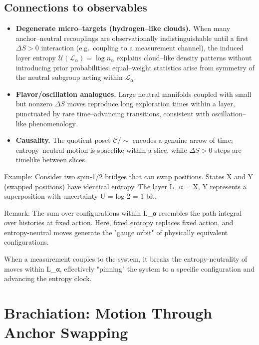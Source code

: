 \documentclass[11pt]{article}
\theoremstyle{plain}
\theoremstyle{definition}
\begin{document}
\subsection{Connections to observables}
\begin{itemize}
  \item \textbf{Degenerate micro–targets (hydrogen–like clouds).}
    When many anchor–neutral recouplings are observationally indistinguishable until a first $\Delta S>0$ interaction (e.g.\ coupling to a measurement channel), the induced layer entropy $\mathcal{U}(\mathcal{L}_\alpha)=\log n_\alpha$ explains cloud–like density patterns without introducing prior probabilities; equal–weight statistics arise from symmetry of the neutral subgroup acting within $\mathcal{L}_\alpha$.
  \item \textbf{Flavor/oscillation analogues.}
    Large neutral manifolds coupled with small but nonzero $\Delta S$ moves reproduce long exploration times within a layer, punctuated by rare time–advancing transitions, consistent with oscillation–like phenomenology.
  \item \textbf{Causality.}
    The quotient poset $\mathcal{C}/\!\sim$ encodes a genuine arrow of time; entropy–neutral motion is spacelike within a slice, while $\Delta S>0$ steps are timelike between slices.
\end{itemize}


Example: Consider two spin-1/2 bridges that can swap positions.
States X and Y (swapped positions) have identical entropy.
The layer L_α = {X, Y} represents a superposition with
uncertainty U = log 2 = 1 bit.

Remark: The sum over configurations within L_α resembles
the path integral over histories at fixed action. Here,
fixed entropy replaces fixed action, and entropy-neutral
moves generate the "gauge orbit" of physically equivalent
configurations.

When a measurement couples to the system, it breaks the
entropy-neutrality of moves within L_α, effectively
"pinning" the system to a specific configuration and
advancing the entropy clock.

\section{Brachiation: Motion Through Anchor Swapping}
\label{sec:brachiation}
\end{document}
